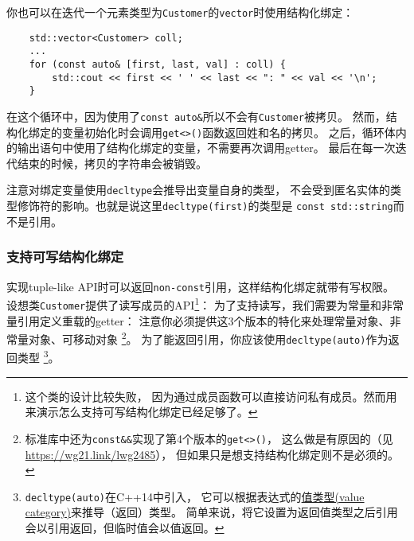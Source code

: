 你也可以在迭代一个元素类型为\texttt{Customer}的\texttt{vector}时使用结构化绑定：
\begin{lstlisting}
    std::vector<Customer> coll;
    ...
    for (const auto& [first, last, val] : coll) {
        std::cout << first << ' ' << last << ": " << val << '\n';
    }
\end{lstlisting}
在这个循环中，因为使用了\texttt{const auto\&}所以不会有\texttt{Customer}被拷贝。
然而，结构化绑定的变量初始化时会调用\texttt{get<>()}函数返回姓和名的拷贝。
之后，循环体内的输出语句中使用了结构化绑定的变量，不需要再次调用getter。
最后在每一次迭代结束的时候，拷贝的字符串会被销毁。

注意对绑定变量使用\texttt{decltype}会推导出变量自身的类型，
不会受到匿名实体的类型修饰符的影响。也就是说这里\texttt{decltype(first)}的类型是
\texttt{const std::string}而不是引用。

\subsubsection{支持可写结构化绑定}
实现tuple-like API时可以返回\texttt{non-const}引用，这样结构化绑定就带有写权限。
设想类\texttt{Customer}提供了读写成员的API\footnote{这个类的设计比较失败，
因为通过成员函数可以直接访问私有成员。然而用来演示怎么支持可写结构化绑定已经足够了。}：
为了支持读写，我们需要为常量和非常量引用定义重载的getter：
注意你必须提供这3个版本的特化来处理常量对象、非常量对象、可移动对象
\footnote{标准库中还为\texttt{const\&\&}实现了第4个版本的\texttt{get<>()}，
这么做是有原因的（见\url{https://wg21.link/lwg2485}），
但如果只是想支持结构化绑定则不是必须的。}。
为了能返回引用，你应该使用\texttt{decltype(auto)}作为返回类型
\footnote{\texttt{decltype(auto)}在C++14中引入，
它可以根据表达式的\hyperref[ch5.3.1]{值类型(value category)}来推导（返回）类型。
简单来说，将它设置为返回值类型之后引用会以引用返回，但临时值会以值返回。}。

